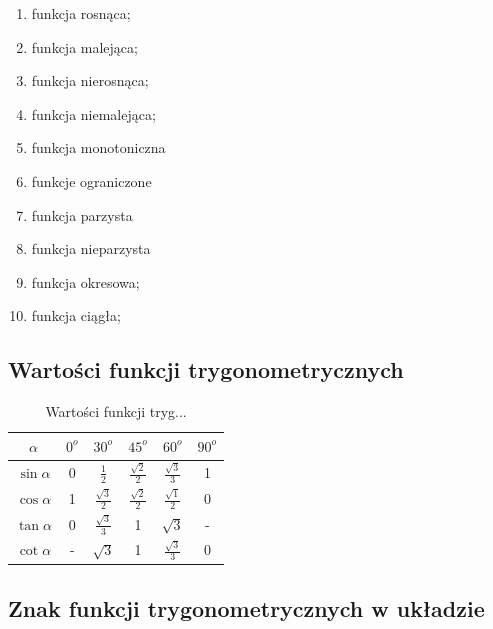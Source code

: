 \documentclass[a4paper]{article}
\begin{document}
\begin{enumerate}
\item funkcja rosnąca;
\item funkcja malejąca;
\item funkcja nierosnąca;
\item funkcja niemalejąca;
\item funkcja monotoniczna
\item funkcje ograniczone
\item funkcja parzysta
\item funkcja nieparzysta
\item funkcja okresowa;
\item funkcja ciągła;
\end{enumerate}

\subsection{Wartości funkcji trygonometrycznych}

\begin{table}[h]

\label{tab:Tabelka}
\centering
\begin{tabular}{|c|c|c|c|c|c|}

\hline
$\alpha $ & $ 0^o$ & $30^o$ & $45^o$ & $60^o$ & $90^o$ \\
\hline
$\sin \alpha$ & 0 & $\frac{1}{2}$ & $\frac{\sqrt{2}}{2}$ & $\frac{\sqrt{3}}{3}$ & 1 \\
\hline
$\cos \alpha$ & 1 & $\frac{\sqrt{3}}{2}$ & $\frac{\sqrt{2}}{2}$ & $\frac{\sqrt{1}}{2}$ & 0 \\
\hline
$\tan \alpha$ & 0 & $\frac{\sqrt{3}}{3}$ & 1 & $\sqrt{3}$ & - \\
\hline
$\cot \alpha$ & - & $\sqrt{3}$ & 1 & $\frac{\sqrt{3}}{3}$ & 0 \\
 \hline
\end{tabular}
\caption{Wartości funkcji tryg...}%
\end{table}

\subsection{Znak funkcji trygonometrycznych w układzie}
\end{document}
